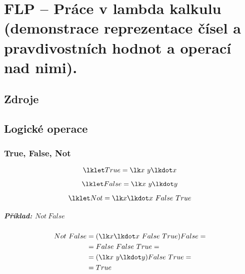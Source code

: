 

\graphicspath{{flp/prace_v_lambda_kalkulu/figures}}


\chapter{FLP -- Práce v lambda kalkulu (demonstrace reprezentace čísel a pravdivostních hodnot a operací nad nimi).}


\section{Zdroje}

\begin{compactitem}
    \item {}
    \item {}
    \item {}
    \item {}
    \item {}
\end{compactitem}


\section{Logické operace}

\subsection{True, False, Not}

$$ \lklet True = \lk x ~ y \lkdot x $$

$$ \lklet False = \lk x ~ y \lkdot y $$

$$ \lklet Not = \lk x \lkdot x ~ False ~ True $$

\paragraph*{Příklad: $Not ~ False$}
\begin{equation}
    \begin{split}
        Not ~ False &= (\lk x \lkdot x ~ False ~ True) False = \\
        &= False ~ False ~ True = \\
        &= (\lk x ~ y \lkdot y) False ~ True = \\
        &= True
    \end{split}
\end{equation}

